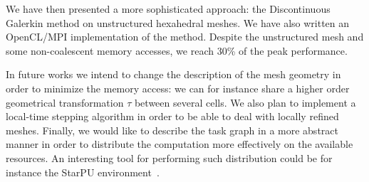 \documentclass[12pt]{amsart}
\begin{document}
We have then presented a more sophisticated approach: the Discontinuous Galerkin method on unstructured hexahedral meshes. We have also written an OpenCL/MPI implementation of the method. Despite the unstructured mesh and some non-coalescent memory accesses, we reach 30\% of the peak performance.

In future works we intend to change the description of the mesh geometry in order to minimize the memory access: we can for instance share a higher order geometrical transformation $\tau$ between several cells. We also plan to implement a local-time stepping algorithm in order to be able to deal with locally refined meshes.  Finally, we would like to describe the task graph in a more abstract manner in order to distribute the computation more effectively  on the available resources. An interesting tool for performing such distribution could be for instance the StarPU environment~\cite{augonnet2011starpu}.



%

%
%
\end{document}
